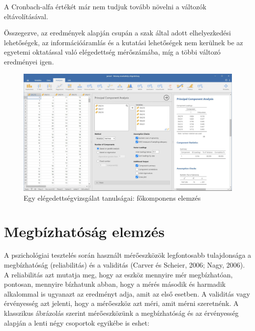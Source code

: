 \documentclass[
  letterpaper,
]{krantz}
\begin{document}
A Cronbach-alfa értékét már nem tudjuk tovább növelni a változók
eltávolításával.

Összegezve, az eredmények alapján csupán a szak által adott
elhelyezkedési lehetőségek, az információáramlás és a kutatási
lehetőségek nem kerülnek be az egyetemi oktatással való elégedettség
mérőszámába, míg a többi változó eredményei igen.

\begin{figure}

{\centering \includegraphics{./images/fokomponens_munkahelyi_elegedettseg_kep_01.jpg}

}

\caption{Egy elégedettségvizsgálat tanulságai: főkomponens elemzés}

\end{figure}


\hypertarget{sec-megbizhatosag-elemzes}{%
\chapter{Megbízhatóság elemzés}\label{sec-megbizhatosag-elemzes}}

A pszichológiai tesztelés során használt mérőeszközök legfontosabb
tulajdonsága a megbízhatóság (reliabilitás) és a validitás (Carver és
Scheier, 2006; Nagy, 2006). A reliabilitás azt mutatja meg, hogy az
eszköz mennyire mér megbízhatóan, pontosan, mennyire bízhatunk abban,
hogy a mérés második és harmadik alkalommal is ugyanazt az eredményt
adja, amit az első esetben. A validitás vagy érvényesség azt jelenti,
hogy a mérőeszköz azt méri, amit mérni szeretnénk. A klasszikus
ábrázolás szerint mérőeszközünk a megbízhatóság és az érvényesség
alapján a lenti négy csoportok egyikébe is eshet:
\end{document}
